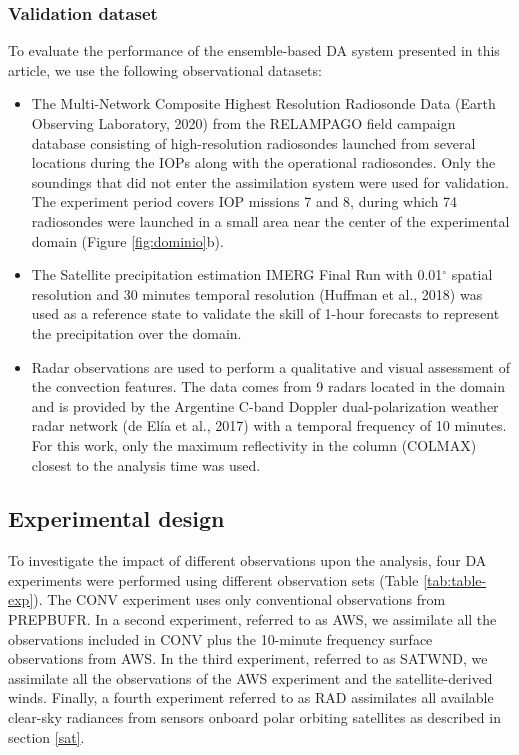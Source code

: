 \documentclass[final,5p,times,twocolumn,authoryear]{elsarticle} %
\begin{document}
\hypertarget{validation-dataset}{%
\subsubsection{Validation dataset}\label{validation-dataset}}

To evaluate the performance of the ensemble-based DA system presented in this article, we use the following observational datasets:

\begin{itemize}
\item
  The Multi-Network Composite Highest Resolution Radiosonde Data (Earth Observing Laboratory, 2020) from the RELAMPAGO field campaign database consisting of high-resolution radiosondes launched from several locations during the IOPs along with the operational radiosondes. Only the soundings that did not enter the assimilation system were used for validation. The experiment period covers IOP missions 7 and 8, during which 74 radiosondes were launched in a small area near the center of the experimental domain (Figure \ref{fig:dominio}b).
\item
  The Satellite precipitation estimation IMERG Final Run with 0.01\(^{\circ}\) spatial resolution and 30 minutes temporal resolution (Huffman et al., 2018) was used as a reference state to validate the skill of 1-hour forecasts to represent the precipitation over the domain.
\item
  Radar observations are used to perform a qualitative and visual assessment of the convection features. The data comes from 9 radars located in the domain and is provided by the Argentine C-band Doppler dual-polarization weather radar network (de Elía et al., 2017) with a temporal frequency of 10 minutes. For this work, only the maximum reflectivity in the column (COLMAX) closest to the analysis time was used.
\end{itemize}

\hypertarget{exp}{%
\subsection{Experimental design}\label{exp}}

To investigate the impact of different observations upon the analysis, four DA experiments were performed using different observation sets (Table \ref{tab:table-exp}). The CONV experiment uses only conventional observations from PREPBUFR. In a second experiment, referred to as AWS, we assimilate all the observations included in CONV plus the 10-minute frequency surface observations from AWS. In the third experiment, referred to as SATWND, we assimilate all the observations of the AWS experiment and the satellite-derived winds. Finally, a fourth experiment referred to as RAD assimilates all available clear-sky radiances from sensors onboard polar orbiting satellites as described in section \ref{sat}.
\end{document}
